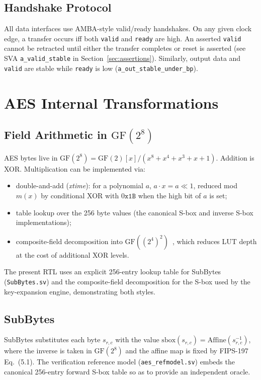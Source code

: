 \documentclass[conference,10pt,a4paper]{IEEEtran}
\begin{document}
\subsection{Handshake Protocol}
All data interfaces use AMBA-style valid/ready handshakes.  On any given
clock edge, a transfer occurs iff both \texttt{valid} and \texttt{ready}
are high.  An asserted \texttt{valid} cannot be retracted until either
the transfer completes or reset is asserted (see SVA
\texttt{a\_valid\_stable} in Section~\ref{sec:assertions}).  Similarly,
output data and \texttt{valid} are stable while \texttt{ready} is low
(\texttt{a\_out\_stable\_under\_bp}).

\section{AES Internal Transformations}
\label{sec:internals}

\subsection{Field Arithmetic in $\mathrm{GF}(2^8)$}
AES bytes live in
$\mathrm{GF}(2^8) = \mathrm{GF}(2)[x] / (x^8 + x^4 + x^3 + x + 1)$.
Addition is XOR.  Multiplication can be implemented via:
\begin{itemize}[leftmargin=*]
  \item double-and-add (\emph{xtime}): for a polynomial $a$,
        $a \cdot x = a \ll 1$, reduced mod $m(x)$ by conditional XOR
        with $0\mathtt{x1B}$ when the high bit of $a$ is set;
  \item table lookup over the 256 byte values (the canonical S-box and
        inverse S-box implementations);
  \item composite-field decomposition into
        $\mathrm{GF}((2^4)^2)$~\cite{satoh,bertoni}, which reduces LUT
        depth at the cost of additional XOR levels.
\end{itemize}
The present RTL uses an explicit 256-entry lookup table for SubBytes
(\texttt{SubBytes.sv}) and the composite-field decomposition for the
S-box used by the key-expansion engine, demonstrating both styles.

\subsection{SubBytes}
SubBytes substitutes each byte $s_{r,c}$ with the value
$\mathrm{sbox}(s_{r,c}) = \mathrm{Affine}(s_{r,c}^{-1})$, where the
inverse is taken in $\mathrm{GF}(2^8)$ and the affine map is fixed by
FIPS-197 Eq.~(5.1).  The verification reference model
(\texttt{aes\_refmodel.sv}) embeds the canonical 256-entry forward S-box
table so as to provide an independent oracle.
\end{document}
